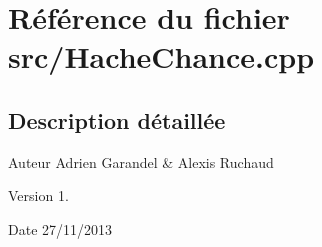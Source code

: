 \section{Référence du fichier src/\-Hache\-Chance.cpp}
\label{_hache_chance_8cpp}


\subsection{Description détaillée}
\begin{DoxyAuthor}{Auteur}
Adrien Garandel \& Alexis Ruchaud 
\end{DoxyAuthor}
\begin{DoxyVersion}{Version}
1. 
\end{DoxyVersion}
\begin{DoxyDate}{Date}
27/11/2013 
\end{DoxyDate}
